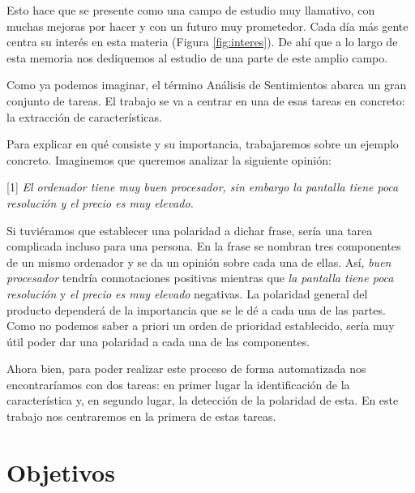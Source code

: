 	 Esto hace que se presente como una campo de estudio muy llamativo, con muchas mejoras por hacer y con un futuro muy prometedor. Cada día más gente centra su interés en esta materia (Figura \ref{fig:interes}). De ahí que a lo largo de esta memoria nos dediquemos al estudio de una parte de este amplio campo.
	 

	Como ya podemos imaginar, el término Análisis de Sentimientos abarca un gran conjunto de tareas. El trabajo se va a centrar en una de esas tareas en concreto: la extracción de características. 

	Para explicar en qué consiste y su importancia, trabajaremos sobre un ejemplo concreto. Imaginemos que queremos analizar la siguiente opinión:
	
	\begin{center}
		\begin{minipage}{0.9\linewidth}
			\vspace{5pt}%
			{\small
				[1] \textit{El ordenador tiene muy buen procesador, sin embargo la pantalla tiene poca resolución y el precio es muy elevado.}
			}
			\vspace{5pt}%
		\end{minipage}
	\end{center}

	Si tuviéramos que establecer una polaridad a dichar frase, sería una tarea complicada incluso para una persona. En la frase se nombran tres componentes de un mismo ordenador y se da un opinión sobre cada una de ellas. Así, \textit{buen procesador} tendría connotaciones positivas mientras que \textit{la pantalla tiene poca resolución} y \textit{el precio es muy elevado} negativas. La polaridad general del producto dependerá de la importancia que se le dé a cada una de las partes. Como no podemos saber a priori un orden de prioridad establecido, sería muy útil poder dar una polaridad a cada una de las componentes.
	
	Ahora bien, para poder realizar este proceso de forma automatizada nos encontraríamos con dos tareas: en primer lugar la identificación de la característica y, en segundo lugar, la detección de la polaridad de esta. En este trabajo nos centraremos en la primera de estas tareas. 

	\section{Objetivos} \label{objetivos}
	
